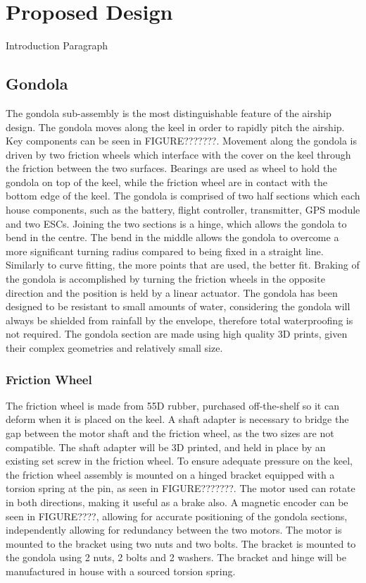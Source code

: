 \documentclass[../main.tex]{subfiles}
\begin{document}
\chapter{Proposed Design}
Introduction Paragraph
\section{Gondola}
The gondola sub-assembly is the most distinguishable feature of the airship design. The gondola moves along the keel in order to rapidly pitch the airship. Key components can be seen in FIGURE???????. Movement along the gondola is driven by two friction wheels which interface with the cover on the keel through the friction between the two surfaces. Bearings are used as wheel to hold the gondola on top of the keel, while the friction wheel are in contact with the bottom edge of the keel. The gondola is comprised of two half sections which each house components, such as the battery, flight controller, transmitter, GPS module and two ESCs. Joining the two sections is a hinge, which allows the gondola to bend in the centre. The bend in the middle allows the gondola to overcome a more significant turning radius compared to being fixed in a straight line. Similarly to curve fitting, the more points that are used, the better fit. Braking of the gondola is accomplished by turning the friction wheels in the opposite direction and the position is held by a linear actuator. The gondola has been designed to be resistant to small amounts of water, considering the gondola will always be shielded from rainfall by the envelope, therefore total waterproofing is not required. The gondola section are made using high quality 3D prints, given their complex geometries and relatively small size.
\\
\subsection{Friction Wheel}
The friction wheel is made from 55D rubber, purchased off-the-shelf so it can deform when it is placed on the keel. A shaft adapter is necessary to bridge the gap between the motor shaft and the friction wheel, as the two sizes are not compatible. The shaft adapter will be 3D printed, and held in place by an existing set screw in the friction wheel. To ensure adequate pressure on the keel, the friction wheel assembly is mounted on a hinged bracket equipped with a torsion spring at the pin, as seen in FIGURE???????. The motor used can rotate in both directions, making it useful as a brake also. A magnetic encoder can be seen in FIGURE????, allowing for accurate positioning of the gondola sections, independently allowing for redundancy between the two motors. The motor is mounted to the bracket using two nuts and two bolts. The bracket is mounted to the gondola using 2 nuts, 2 bolts and 2 washers. The bracket and hinge will be manufactured in house with a sourced torsion spring.
\\
\end{document}
